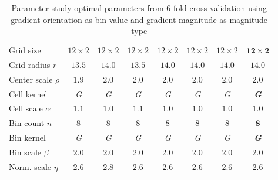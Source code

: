 \documentclass[thesis.tex]{subfiles}
\begin{document}
\begin{table}[p]
\begin{tabular}{ l c c c c c c c}
Grid size & $12 \times 2$ & $12 \times 2$ & $12 \times 2$ & $12 \times 2$ & $12 \times 2$ & $12 \times 2$ & \textbf{$\mathbf{12 \times 2}$} \\
Grid radius $r$ & $13.5$ & $14.0$ & $13.5$ & $14.0$ & $14.0$ & $14.0$ & $\mathbf{14.0}$ \\
Center scale $\rho$ & $1.9$ & $2.0$ & $2.0$ & $2.0$ & $2.0$ & $2.0$ & $\mathbf{2.0}$ \\
Cell kernel & \textit{G} & \textit{G} & \textit{G} & \textit{G} & \textit{G} & \textit{G} & \textbf{\textit{G}} \\
Cell scale $\alpha$ & $1.1$ & $1.0$ & $1.1$ & $1.0$ & $1.0$ & $1.0$ & $\mathbf{1.0}$ \\
Bin count $n$ & $8$ & $8$ & $8$ & $8$ & $8$ & $8$ & $\mathbf{8}$ \\
Bin kernel & \textit{G} & \textit{G} & \textit{G} & \textit{G} & \textit{G} & \textit{G} & \textbf{\textit{G}} \\
Bin scale $\beta$ & $2.0$ & $2.0$ & $2.0$ & $2.0$ & $2.0$ & $2.0$ & $\mathbf{2.0}$ \\
Norm. scale $\eta$ & $2.6$ & $2.8$ & $2.6$ & $2.6$ & $2.6$ & $2.6$ & $\mathbf{2.6}$ \\
\bottomrule
\end{tabular}
\caption{Parameter study optimal parameters from 6-fold cross validation using gradient orientation as bin value and gradient magnitude as magnitude type}
\label{fig:ICparamsSi}
\end{table}
%
\end{document}
